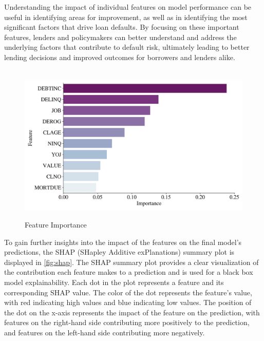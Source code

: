         Understanding the impact of individual features on model performance can be useful in identifying areas for improvement, as well as in identifying the most significant factors that drive loan defaults.
        By focusing on these important features, lenders and policymakers can better understand and address the underlying factors that contribute to default risk, ultimately leading to better lending decisions and improved outcomes for borrowers and lenders alike.
        
        \begin{figure}[H]
            \centering
            \caption{Feature Importance}\vspace{0.5em}
            \label{fig:fi}\
            \includegraphics[width=140mm]{Figures/Feature_Importances.jpg}
            \vspace{-1em}
        \end{figure}
        
        To gain further insights into the impact of the features on the final model's predictions, the SHAP (SHapley Additive exPlanations) summary plot is displayed in \autoref{fig:shap}.
        The SHAP summary plot provides a clear visualization of the contribution each feature makes to a prediction and is used for a black box model explainability.
        Each dot in the plot represents a feature and its corresponding SHAP value.
        The color of the dot represents the feature's value, with red indicating high values and blue indicating low values.
        The position of the dot on the x-axis represents the impact of the feature on the prediction, with features on the right-hand side contributing more positively to the prediction, and features on the left-hand side contributing more negatively.
        
